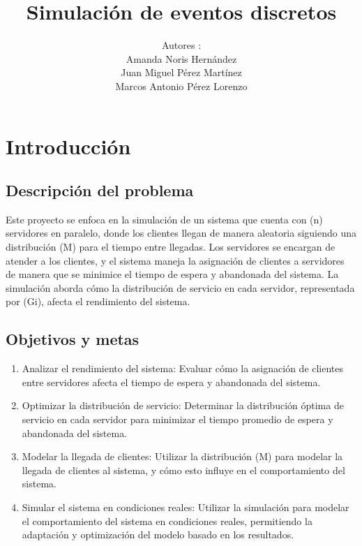\documentclass[12pt]{article}
\title{Simulación de eventos discretos}
\author{
  Autores :\\
  Amanda Noris Hernández \\
  Juan Miguel Pérez Martínez \\
  Marcos Antonio Pérez Lorenzo\\
}
\begin{document}
\maketitle


\section{Introducción}

\subsection{Descripción del problema}
Este proyecto se enfoca en la simulación de un sistema que cuenta con (n) servidores en paralelo, donde los clientes llegan de manera aleatoria siguiendo una distribución (M) para el tiempo entre llegadas. Los servidores se encargan de atender a los clientes, y el sistema maneja la asignación de clientes a servidores de manera que se minimice el tiempo de espera y abandonada del sistema. La simulación aborda cómo la distribución de servicio en cada servidor, representada por (Gi), afecta el rendimiento del sistema.

\subsection{Objetivos y metas}
\begin{enumerate}
\item Analizar el rendimiento del sistema: Evaluar cómo la asignación de clientes entre servidores afecta el tiempo de espera y abandonada del sistema.
\item Optimizar la distribución de servicio: Determinar la distribución óptima de servicio en cada servidor para minimizar el tiempo promedio de espera y abandonada del sistema.
\item Modelar la llegada de clientes: Utilizar la distribución (M) para modelar la llegada de clientes al sistema, y cómo esto influye en el comportamiento del sistema.
\item Simular el sistema en condiciones reales: Utilizar la simulación para modelar el comportamiento del sistema en condiciones reales, permitiendo la adaptación y optimización del modelo basado en los resultados.
\end{enumerate}
\end{document}
